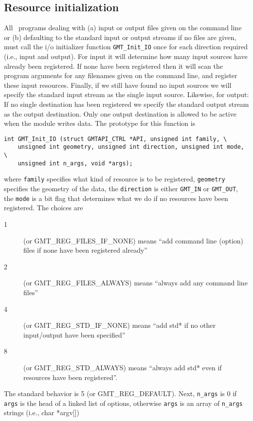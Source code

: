 \documentclass[11pt]{report}
\begin{document}
\subsection{Resource initialization}
All \GMT\ programs dealing with (a) input or output files given on the command line or (b) defaulting to
the standard input or output streams if no files are given, must call the i/o initializer function
\texttt{GMT\_Init\_IO} once for each direction required (i.e., input and output).
For input it will determine how many input sources have already been registered.
If none have been registered then it will scan the program arguments for any filenames given on the command line, and register
these input resources.  Finally, if we still have found no input sources we will specify the standard input stream
as the single input source.  Likewise, for output: If no single destination has been registered we specify the standard output stream
as the output destination.  Only one output destination is allowed to be active when the module writes data.
The prototype for this function is

\begin{verbatim}
int GMT_Init_IO (struct GMTAPI_CTRL *API, unsigned int family, \
    unsigned int geometry, unsigned int direction, unsigned int mode, \
    unsigned int n_args, void *args);
\end{verbatim}
where \texttt{family} specifies what kind of resource is to be registered,
\texttt{geometry} specifies the geometry of the data,
the \texttt{direction} is either \texttt{GMT\_IN} or \texttt{GMT\_OUT}, the
\texttt{mode} is a bit flag that determines what we do if no resources have been
registered. The choices are
\begin{description}
	\item [1] (or GMT\_REG\_FILES\_IF\_NONE) means ``add command line (option) files if none have been registered already''
	\item [2] (or GMT\_REG\_FILES\_ALWAYS) means ``always add any command line files''
	\item [4] (or GMT\_REG\_STD\_IF\_NONE) means ``add std* if no other input/output have been specified''
	\item [8] (or GMT\_REG\_STD\_ALWAYS) means ``always add std* even if resources have been registered''.
\end{description}
The standard behavior is 5 (or GMT\_REG\_DEFAULT).
Next, \texttt{n\_args} is 0 if \texttt{args} is the head of a linked list of options, otherwise \texttt{args} is an array of \texttt{n\_args} strings (i.e., char *argv[])
\end{document}
